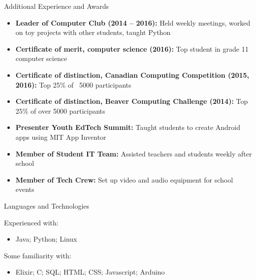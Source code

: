 \documentclass[]{mcdowellcv}
\begin{document}
	\begin{cvsection}{Additional Experience and Awards}
		\begin{cvsubsection}{}{}{}
			\begin{itemize}
				\item \textbf{Leader of Computer Club (2014 – 2016):} Held weekly meetings, worked on toy projects with other students, taught Python
				\item \textbf{Certificate of merit, computer science (2016):} Top student in grade 11 computer science
				\item \textbf{Certificate of distinction, Canadian Computing Competition (2015, 2016):} Top 25\% of ~5000 participants
				\item \textbf{Certificate of distinction, Beaver Computing Challenge (2014):} Top 25\% of over 5000 participants
				\item \textbf{Presenter Youth EdTech Summit:} Taught students to create Android apps using MIT App Inventor
				\item \textbf{Member of Student IT Team:} Assisted teachers and students weekly after school
				\item \textbf{Member of Tech Crew:} Set up video and audio equipment for school events
			\end{itemize}
		\end{cvsubsection}
	\end{cvsection}

	\begin{cvsection}{Languages and Technologies}
		\begin{cvsubsection}{}{}{}
            Experienced with:
			\begin{itemize}
				\item Java; Python; Linux
            \end{itemize}
            Some familiarity with:
            \begin{itemize}
                \item Elixir; C; SQL; HTML; CSS; Javascript; Arduino
			\end{itemize}
		\end{cvsubsection}
	\end{cvsection}
\end{document}
